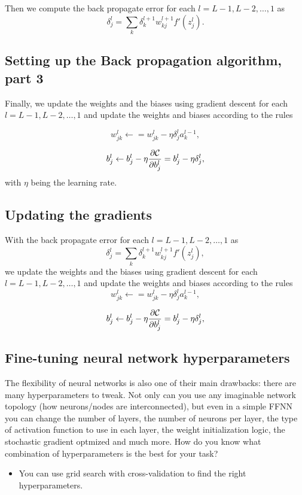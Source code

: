 \documentclass[%
oneside,                 %
final,                   %
10pt]{article}
\begin{document}
Then we compute the back propagate error for each $l=L-1,L-2,\dots,1$ as
\[
\delta_j^l = \sum_k \delta_k^{l+1}w_{kj}^{l+1}f'(z_j^l).
\]

\subsection{Setting up the Back propagation algorithm, part 3}

Finally, we update the weights and the biases using gradient descent
for each $l=L-1,L-2,\dots,1$ and update the weights and biases
according to the rules

\[
w_{jk}^l\leftarrow  = w_{jk}^l- \eta \delta_j^la_k^{l-1},
\]

\[
b_j^l \leftarrow b_j^l-\eta \frac{\partial {\cal C}}{\partial b_j^l}=b_j^l-\eta \delta_j^l,
\]
with $\eta$ being the learning rate.

\subsection{Updating the gradients}

With the back propagate error for each $l=L-1,L-2,\dots,1$ as
\[
\delta_j^l = \sum_k \delta_k^{l+1}w_{kj}^{l+1}f'(z_j^l),
\]
we update the weights and the biases using gradient descent for each $l=L-1,L-2,\dots,1$ and update the weights and biases according to the rules
\[
w_{jk}^l\leftarrow  = w_{jk}^l- \eta \delta_j^la_k^{l-1},
\]

\[
b_j^l \leftarrow b_j^l-\eta \frac{\partial {\cal C}}{\partial b_j^l}=b_j^l-\eta \delta_j^l,
\]

\subsection{Fine-tuning neural network hyperparameters}

The flexibility of neural networks is also one of their main
drawbacks: there are many hyperparameters to tweak. Not only can you
use any imaginable network topology (how neurons/nodes are
interconnected), but even in a simple FFNN you can change the number
of layers, the number of neurons per layer, the type of activation
function to use in each layer, the weight initialization logic, the
stochastic gradient optmized and much more. How do you know what
combination of hyperparameters is the best for your task?

\begin{itemize}
\item You can use grid search with cross-validation to find the right hyperparameters.
\end{itemize}
\end{document}

